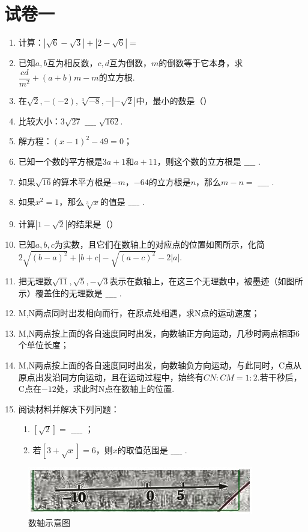 \documentclass[12pt]{ctexart}
\begin{document}
\section*{试卷一}
\begin{enumerate}[label=\arabic*.]
    \item 计算：$\left|\sqrt{6}-\sqrt{3}\right|+\left|2-\sqrt{6}\right|=$
    \item 已知$a,b$互为相反数，$c,d$互为倒数，$m$的倒数等于它本身，求$\dfrac{cd}{m^2}+(a+b)m-m$的立方根.
    \item 在$\sqrt{2},-(-2),\sqrt[3]{-8},-|- \sqrt{2}|$中，最小的数是（）
    \item 比较大小：$3\sqrt{27}$ $\_\_\_\_$ $\sqrt{162}$.
    \item 解方程：$(x-1)^2-49=0$；
    \item 已知一个数的平方根是$3a+1$和$a+11$，则这个数的立方根是 $\_\_\_\_$ .
    \item 如果$\sqrt{16}$的算术平方根是$-m$，$-64$的立方根是$n$，那么$m-n=$ $\_\_\_\_$ .
    \item 如果$x^2=1$，那么$\sqrt[3]{x}$的值是 $\_\_\_\_$ .
    \item 计算$|1-\sqrt{2}|$的结果是（）
    \item 已知$a,b,c$为实数，且它们在数轴上的对应点的位置如图所示，化简$2\sqrt{(b-a)^2}+|b+c|-\sqrt{(a-c)^2}-2|a|$.
    \item 把无理数$\sqrt{11},\sqrt{5},-\sqrt{3}$表示在数轴上，在这三个无理数中，被墨迹（如图所示）覆盖住的无理数是 $\_\_\_\_$ .
    \item M,N两点同时出发相向而行，在原点处相遇，求N点的运动速度；
    \item M,N两点按上面的各自速度同时出发，向数轴正方向运动，几秒时两点相距6个单位长度；
    \item M,N两点按上面的各自速度同时出发，向数轴负方向运动，与此同时，C点从原点出发沿同方向运动，且在运动过程中，始终有$CN:CM=1:2$.若干秒后，C点在$-12$处，求此时N点在数轴上的位置.
    \item 阅读材料并解决下列问题：
        \begin{enumerate}
            \item $[\sqrt{2}]=$ $\_\_\_\_$ ；
            \item 若$[3+\sqrt{x}]=6$，则$x$的取值范围是 $\_\_\_\_$ .
        \end{enumerate}
\end{enumerate}

\begin{figure}[H]
    \centering
    \includegraphics[scale=0.5]{cropped_1.jpg}
    \caption{数轴示意图}
\end{figure}
\end{document}
